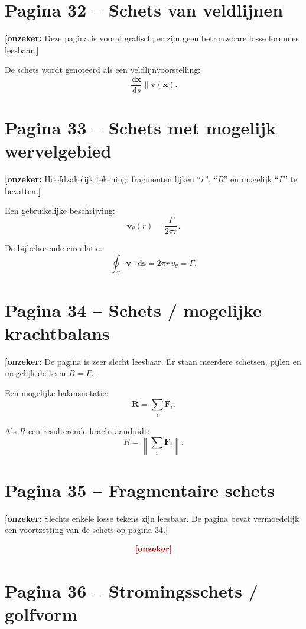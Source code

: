 \documentclass[11pt,a4paper]{article}
\newcommand{\onzeker}[1]{\ifmmode\text{\color{red!70!black}\bfseries[onzeker]}\else\textcolor{red!70!black}{\textbf{[onzeker:} #1\textbf{]}}\fi}
\newcommand{\dd}{\,\mathrm{d}}
\begin{document}
\section*{Pagina 32 -- Schets van veldlijnen}

\onzeker{Deze pagina is vooral grafisch; er zijn geen betrouwbare losse formules leesbaar.}

De schets wordt genoteerd als een veldlijnvoorstelling:
\[
    \frac{\dd\mathbf{x}}{\dd s}
    \parallel
    \mathbf{v}(\mathbf{x}).
\]

\section*{Pagina 33 -- Schets met mogelijk wervelgebied}

\onzeker{Hoofdzakelijk tekening; fragmenten lijken ``$r$'', ``$R$'' en mogelijk ``$\Gamma$'' te bevatten.}

Een gebruikelijke beschrijving:
\[
    \mathbf{v}_\theta(r)
    =
    \frac{\Gamma}{2\pi r}.
\]

De bijbehorende circulatie:
\[
    \oint_C \mathbf{v}\cdot\dd\mathbf{s}
    =
    2\pi r\,v_\theta
    =
    \Gamma .
\]

\section*{Pagina 34 -- Schets / mogelijke krachtbalans}

\onzeker{De pagina is zeer slecht leesbaar. Er staan meerdere schetsen, pijlen en mogelijk de term $R=F$.}

Een mogelijke balansnotatie:
\[
    \mathbf{R}
    =
    \sum_i \mathbf{F}_i .
\]

Als $R$ een resulterende kracht aanduidt:
\[
    R
    =
    \left\lVert
    \sum_i \mathbf{F}_i
    \right\rVert .
\]

\section*{Pagina 35 -- Fragmentaire schets}

\onzeker{Slechts enkele losse tekens zijn leesbaar. De pagina bevat vermoedelijk een voortzetting van de schets op pagina 34.}

\[
    \onzeker{\text{grafische constructie met } R,\ F,\ \theta}
\]

\section*{Pagina 36 -- Stromingsschets / golfvorm}
\end{document}
